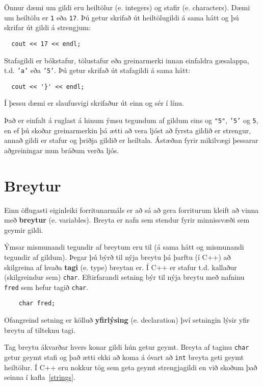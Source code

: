 Önnur dæmi um gildi eru heiltölur (e. integers) og stafir (e. characters).
Dæmi um heiltölu er {\tt 1} eða {\tt 17}. 
Þú getur skrifað út heiltölugildi á sama hátt og þú skrifar út gildi á strengjum:

\begin{verbatim}
  cout << 17 << endl;
\end{verbatim}
%
Stafagildi er bókstafur, tölustafur eða greinarmerki innan einfaldra gæsalappa, t.d. {\tt 'a'} eða {\tt '5'}.
Þú getur skrifað út stafagildi á sama hátt:

\begin{verbatim}
  cout << '}' << endl;
\end{verbatim}
%
Í þessu dæmi er slaufusvigi skrifaður út einn og sér í línu.

Það er einfalt á ruglast á hinum ýmsu tegundum af gildum eins og 
\verb+"5"+, {\tt '5'} og {\tt 5}, en ef þú skoðar greinarmerkin þá ætti að vera ljóst að
fyrsta gildið er strengur, annað gildi er stafur og þriðja gildið er heiltala.
Ástæðan fyrir mikilvægi þessarar aðgreiningar mun bráðum verða ljós.

\section {Breytur}

Einn öflugasti eiginleiki forritunarmáls er að sá að gera forriturum kleift að vinna með {\bf breytur} (e. variables).
Breyta er nafn sem stendur fyrir minnissvæði sem geymir gildi. 

Ýmsar mismunandi tegundir af breytum eru til (á sama hátt og mismunandi tegundir af gildum).
Þegar þú býrð til nýja breytu þá þarftu (í C++) að skilgreina af hvaða {\bf tagi} (e. type) breytan er.
Í C++ er stafur t.d. kallaður (skilgreindur sem) {\tt char}.
Eftirfarandi setning býr til nýja breytu með nafninu {\tt fred} sem hefur tagið {\tt char}.

\begin{verbatim}
    char fred;
\end{verbatim}
%
Ofangreind setning er kölluð {\bf yfirlýsing} (e. declaration) því setningin lýsir yfir breytu af tilteknu tagi.

Tag breytu ákvarðar hvers konar gildi hún getur geymt.
Breyta af taginu {\tt char} getur geymt stafi og það ætti ekki að koma á óvart að {\tt int} breyta geti geymt heiltölur.
Í C++ eru nokkur tög sem geta geymt strengjagildi en við skoðum það seinna í kafla~\ref{strings}.

